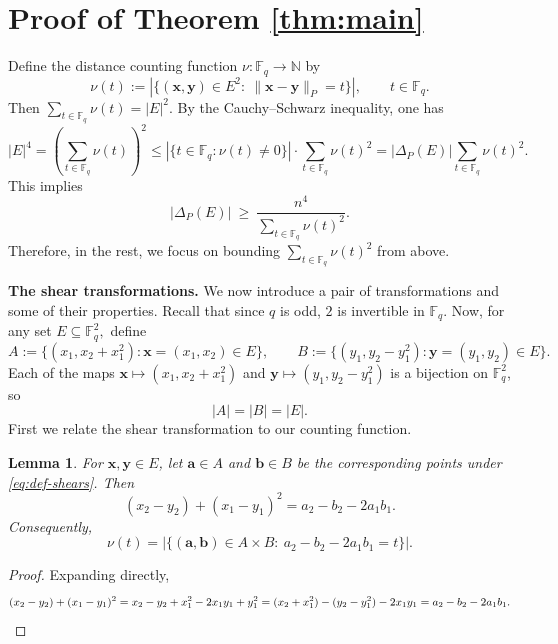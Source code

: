\documentclass{article}
\newtheorem{lemma}[theorem]{Lemma}
\newcommand{\F}{\mathbb{F}}
\newcommand{\abs}[1]{\left|#1\right|}
\newcommand{\1}{\mathbf{1}}
\begin{document}
\section{Proof of Theorem \ref{thm:main}}\label{sec:proof-main}

Define the distance counting function $\nu:\F_q\to\mathbb N$ by
\begin{equation*}
\nu(t):=\abs{\{(\mathbf{x}, \mathbf{y})\in E^2:\ \|\mathbf{x}-\mathbf{y}\|_{P}=t\}},
\qquad t\in\F_q.
\end{equation*}
Then $\sum\limits_{t\in \F_q}\nu(t)=|E|^2$. By the Cauchy--Schwarz inequality, one has
\[
|E|^4
=
\left(\sum_{t\in \F_q}\nu(t)\right)^2
\le
\abs{\{t\in \F_q:\nu(t)\ne 0\}}
\cdot
\sum_{t\in \F_q}\nu(t)^2
=
\abs{\Delta_P(E)}\sum_{t\in \F_q}\nu(t)^2.
\]
This implies 
\begin{equation}\label{eq111}
\abs{\Delta_P(E)}\ \ge\ \frac{n^4}{\sum\limits_{t\in\F_q}\nu(t)^2}.
\end{equation}
Therefore, in the rest, we focus on bounding $\sum\limits_{t\in \F_q}\nu(t)^2$ from above.

\textbf{The shear transformations.} We now introduce a pair of transformations and some of their properties. Recall that since $q$ is odd, $2$ is invertible in $\F_q$. Now, for any set $E\subseteq \mathbb F_q^2,$ define
\begin{equation}\label{eq:def-shears}
A:=\{(x_1,x_2+x_1^2):\mathbf{x}=(x_1,x_2)\in E\},
\qquad
B:=\{(y_1,y_2-y_1^2):\mathbf{y}=(y_1,y_2)\in E\}.
\end{equation}
Each of the maps $\mathbf{x}\mapsto(x_1,x_2+x_1^2)$ and $\mathbf{y}\mapsto(y_1,y_2-y_1^2)$ is a bijection on $\F_q^2$, so
\begin{equation*}
|A|=|B|=|E|.
\end{equation*}
First we relate the shear transformation to our counting function.
\begin{lemma}\label{lem:shear-identity}
For $\mathbf{x},\mathbf{y}\in E$, let $\mathbf{a}\in A$ and $\mathbf{b}\in B$ be the corresponding points under \eqref{eq:def-shears}. Then
\[
(x_2-y_2)+(x_1-y_1)^2=a_2-b_2-2a_1b_1.
\]
Consequently,
\[
\nu(t)=\abs{\{(\mathbf{a},\mathbf{b})\in A\times B:\ a_2-b_2-2a_1b_1=t\}}.
\]
\end{lemma}

\begin{proof}
Expanding directly,
\[
(x_2-y_2)+(x_1-y_1)^2
=
x_2-y_2+x_1^2-2x_1y_1+y_1^2
=
(x_2+x_1^2)-(y_2-y_1^2)-2x_1y_1
=
a_2-b_2-2a_1b_1. \qedhere
\]
\end{proof}
\end{document}
